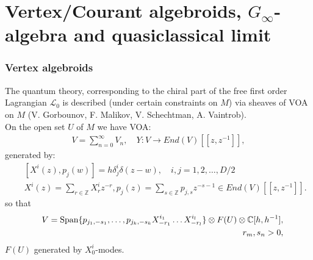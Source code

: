 \documentclass[9pt]{beamer}
\begin{document}
\section{Vertex/Courant algebroids, $G_{\infty}$-algebra and quasiclassical limit}
\begin{frame}
\frametitle{Vertex algebroids}
The quantum theory, corresponding to the chiral part of the free first order Lagrangian $\mathcal{L}_0$ is described (under certain constraints on $M$) via sheaves of VOA on $M$ (V. Gorbounov, F. Malikov, V. Schechtman, A. Vaintrob).  \\

On the open set $U$ of $M$ we have VOA:
\begin{eqnarray*}
V=\sum_{n=0}^{\infty}V_n, \quad  Y: V\to End(V)[[z,z^{-1}]], 
\end{eqnarray*}
generated by:
\begin{eqnarray*}
&&[X^i(z),p_j(w)]=h\delta^i_j\delta(z-w), \quad i,j=1,2,\dots ,D/2\\
&&X^i(z)=\sum_{r\in \mathbb{Z}}X^i_rz^{-r}, p_j(z)=\sum_{s\in \mathbb{Z}} p_{j,s}z^{-s-1}\in End(V)[[z,z^{-1}]].
\end{eqnarray*}
so that 
\begin{eqnarray*}
&&V={\rm Span}\{p_{j_1, -s_1}, \dots, p_{j_k, -s_k}X^{i_1}_{-r_1}\dots 
X^{i_l}_{-r_l}\}\otimes F(U)\otimes{\mathbb{C}[h,h^{-1}]}, \\
&& r_m, s_n > 0,
\end{eqnarray*}
$F(U)$ generated by $X^i_0$-modes.

\end{frame}
\end{document}
